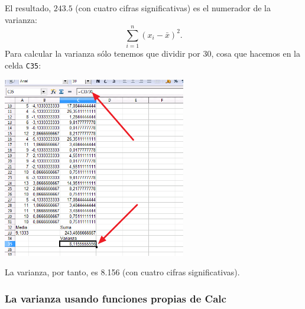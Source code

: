 \documentclass[10pt,a4paper]{article}\usepackage[]{graphicx}\usepackage[]{color}
\begin{document}
El resultado, $243.5$ (con cuatro cifras significativas) es el numerador de la varianza:
\[\displaystyle\sum_{i=1}^n(x_i-\bar x)^2.\]
Para calcular la varianza sólo tenemos que dividir por 30, cosa que hacemos en la celda {\tt C35}:
    \begin{center}
    \includegraphics[width=8cm]{../fig/Tut02-53.png}
    \end{center}
La varianza, por tanto, es 8.156 (con cuatro cifras significativas).

\subsubsection*{La varianza usando funciones propias de Calc}
\label{tut01:subsubsec:VarianzaConFuncionesPropiasCalc}
\end{document}
